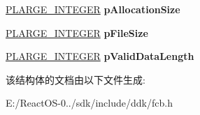 \begin{DoxyCompactItemize}
\item 
\mbox{\label{struct___f_c_b___i_n_i_t___p_a_c_k_e_t_a4da1d7f714eb1864017dd2510c411aa4}} 
\hyperlink{union___l_a_r_g_e___i_n_t_e_g_e_r}{P\+L\+A\+R\+G\+E\+\_\+\+I\+N\+T\+E\+G\+ER} {\bfseries p\+Allocation\+Size}
\item 
\mbox{\label{struct___f_c_b___i_n_i_t___p_a_c_k_e_t_a396484c661adf7330db58f7dd338c33a}} 
\hyperlink{union___l_a_r_g_e___i_n_t_e_g_e_r}{P\+L\+A\+R\+G\+E\+\_\+\+I\+N\+T\+E\+G\+ER} {\bfseries p\+File\+Size}
\item 
\mbox{\label{struct___f_c_b___i_n_i_t___p_a_c_k_e_t_aa83dcd5c7af1c04c0579386d450802f9}} 
\hyperlink{union___l_a_r_g_e___i_n_t_e_g_e_r}{P\+L\+A\+R\+G\+E\+\_\+\+I\+N\+T\+E\+G\+ER} {\bfseries p\+Valid\+Data\+Length}
\end{DoxyCompactItemize}


该结构体的文档由以下文件生成\+:\begin{DoxyCompactItemize}
\item 
E\+:/\+React\+O\+S-\/0../sdk/include/ddk/fcb.\+h\end{DoxyCompactItemize}
